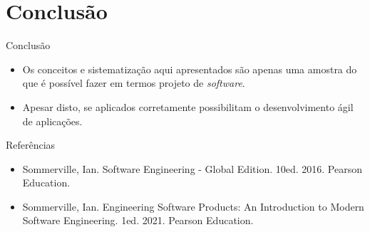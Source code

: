 \documentclass[11pt,justified]{beamer}
\begin{document}
\section{Conclusão}

\begin{frame}{Conclusão}
    \begin{itemize}
        \item Os conceitos e sistematização aqui apresentados são apenas uma amostra do que é possível fazer em termos projeto de \textit{software}.
        \item Apesar disto, se aplicados corretamente possibilitam o desenvolvimento ágil de aplicações.
    \end{itemize}
\end{frame}

\begin{frame}{Referências}
    \begin{itemize}
        \item Sommerville, Ian. Software Engineering - Global Edition. 10ed. 2016. Pearson Education.
        \item Sommerville, Ian. Engineering Software Products: An Introduction to Modern Software Engineering. 1ed. 2021. Pearson Education.
    \end{itemize}
\end{frame}
\end{document}
